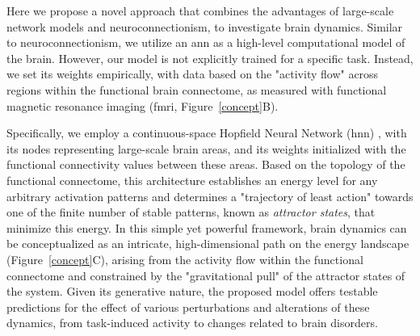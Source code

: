 \documentclass{article}
\begin{document}
Here we propose a novel approach that combines the advantages of large-scale network models and neuroconnectionism, to investigate brain dynamics.
Similar to neuroconnectionism, we utilize an \acrshort{ann} as a high-level computational model of the brain.
However, our model is not explicitly trained for a specific task. Instead, we set its weights empirically, with data based on the "activity flow" \citep{cole2016activity, ito2017cognitive} across regions within the functional brain connectome, as measured with functional magnetic resonance imaging (\acrshort{fmri}, Figure~\ref{concept}B).

Specifically, we employ a continuous-space Hopfield Neural Network (\acrshort{hnn}) \citep{hopfield1982neural, krotov2023new}, with its nodes representing large-scale brain areas, and its weights initialized with the functional connectivity values between these areas.
Based on the topology of the functional connectome, this architecture establishes an energy level for any arbitrary activation patterns and determines a "trajectory of least action" towards one of the finite number of stable patterns, known as \textit{attractor states}, that minimize this energy.
In this simple yet powerful framework, brain dynamics can be conceptualized as an intricate, high-dimensional path on the energy landscape (Figure~\ref{concept}C), arising from the activity flow \citep{cole2016activity} within the functional connectome and constrained by the "gravitational pull" of the attractor states of the system.
Given its generative nature, the proposed model offers testable predictions for the effect of various perturbations and alterations of these dynamics, from task-induced activity to changes related to brain disorders.
\end{document}
